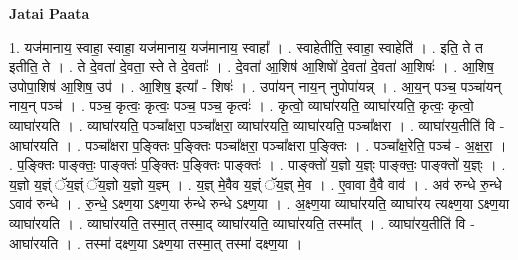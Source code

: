 \documentclass[17pt]{extarticle}
\begin{document}
\textbf{Jatai Paata} \newline

1. यज॑मानाय॒ स्वाहा॒ स्वाहा॒ यज॑मानाय॒ यज॑मानाय॒ स्वाहा᳚ । . स्वाहेतीति॒ स्वाहा॒ स्वाहेति॑ । . इति॒ ते त इतीति॒ ते । . ते दे॒वता॑ दे॒वता॒ स्ते ते दे॒वताः᳚ । . दे॒वता॑ आ॒शिष॑ आ॒शिषो॑ दे॒वता॑ दे॒वता॑ आ॒शिषः॑ । . आ॒शिष॒ उपोपा॒शिष॑ आ॒शिष॒ उप॑ । . आ॒शिष॒ इत्या᳚ - शिषः॑ । . उपा॑यन् नाय॒न् नुपोपा॑यन्न् । . आ॒य॒न् पञ्च॒ पञ्चा॑यन् नाय॒न् पञ्च॑ । . पञ्च॒ कृत्वः॒ कृत्वः॒ पञ्च॒ पञ्च॒ कृत्वः॑ । . कृत्वो॒ व्याघा॑रयति॒ व्याघा॑रयति॒ कृत्वः॒ कृत्वो॒ व्याघा॑रयति । . व्याघा॑रयति॒ पञ्चा᳚क्षरा॒ पञ्चा᳚क्षरा॒ व्याघा॑रयति॒ व्याघा॑रयति॒ पञ्चा᳚क्षरा । . व्याघा॑रय॒तीति॑ वि - आघा॑रयति । . पञ्चा᳚क्षरा प॒ङ्क्तिः प॒ङ्क्तिः पञ्चा᳚क्षरा॒ पञ्चा᳚क्षरा प॒ङ्क्तिः । . पञ्चा᳚क्ष॒रेति॒ पञ्च॑ - अ॒क्ष॒रा॒ । . प॒ङ्क्तिः पाङ्क्तः॒ पाङ्क्तः॑ प॒ङ्क्तिः प॒ङ्क्तिः पाङ्क्तः॑ । . पाङ्क्तो॑ य॒ज्ञो य॒ज्ञ्ः पाङ्क्तः॒ पाङ्क्तो॑ य॒ज्ञ्ः । . य॒ज्ञो य॒ज्ञ्ं ॅय॒ज्ञ्ं ॅय॒ज्ञो य॒ज्ञो य॒ज्ञ्म् । . य॒ज्ञ् मे॒वैव य॒ज्ञ्ं ॅय॒ज्ञ् मे॒व । . ए॒वावा वै॒वै वाव॑ । . अव॑ रुन्धे रु॒न्धे ऽवाव॑ रुन्धे । . रु॒न्धे॒ ऽक्ष्ण॒या ऽक्ष्ण॒या रु॑न्धे रुन्धे ऽक्ष्ण॒या । . अ॒क्ष्ण॒या व्याघा॑रयति॒ व्याघा॑रय त्यक्ष्ण॒या ऽक्ष्ण॒या व्याघा॑रयति । . व्याघा॑रयति॒ तस्मा॒त् तस्मा॒द् व्याघा॑रयति॒ व्याघा॑रयति॒ तस्मा᳚त् । . व्याघा॑रय॒तीति॑ वि - आघा॑रयति । . तस्मा॑ दक्ष्ण॒या ऽक्ष्ण॒या तस्मा॒त् तस्मा॑ दक्ष्ण॒या । \newline
\end{document}
